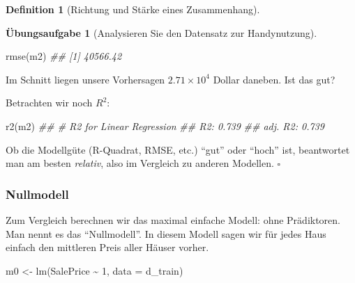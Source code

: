 \documentclass[
  a4paper,
  DIV=11]{scrreprt}
\newenvironment{Shaded}{\begin{snugshade}}{\end{snugshade}}
\newcommand{\AttributeTok}[1]{\textcolor[rgb]{0.40,0.45,0.13}{#1}}
\newcommand{\DecValTok}[1]{\textcolor[rgb]{0.68,0.00,0.00}{#1}}
\newcommand{\DocumentationTok}[1]{\textcolor[rgb]{0.37,0.37,0.37}{\textit{#1}}}
\newcommand{\FunctionTok}[1]{\textcolor[rgb]{0.28,0.35,0.67}{#1}}
\newcommand{\NormalTok}[1]{\textcolor[rgb]{0.00,0.23,0.31}{#1}}
\newcommand{\OtherTok}[1]{\textcolor[rgb]{0.00,0.23,0.31}{#1}}
\newcommand{\SpecialCharTok}[1]{\textcolor[rgb]{0.37,0.37,0.37}{#1}}
\theoremstyle{definition}
\newtheorem{exercise}{Übungsaufgabe}[chapter]
\theoremstyle{definition}
\theoremstyle{definition}
\newtheorem{definition}{Definition}[chapter]
\theoremstyle{remark}
\begin{document}
\begin{definition}[Richtung und Stärke eines
Zusammenhang]
\begin{exercise}[Analysieren Sie den Datensatz zur
Handynutzung]
\begin{Shaded}
\begin{Highlighting}[]
\FunctionTok{rmse}\NormalTok{(m2)}
\DocumentationTok{\#\# [1] 40566.42}
\end{Highlighting}
\end{Shaded}

Im Schnitt liegen unsere Vorhersagen \ensuremath{2.71\times 10^{4}}
Dollar daneben. Ist das gut?

Betrachten wir noch \(R^2\):

\begin{Shaded}
\begin{Highlighting}[]
\FunctionTok{r2}\NormalTok{(m2)}
\DocumentationTok{\#\# \# R2 for Linear Regression}
\DocumentationTok{\#\#        R2: 0.739}
\DocumentationTok{\#\#   adj. R2: 0.739}
\end{Highlighting}
\end{Shaded}

\begin{tcolorbox}[enhanced jigsaw, leftrule=.75mm, opacitybacktitle=0.6, colback=white, colframe=quarto-callout-note-color-frame, coltitle=black, colbacktitle=quarto-callout-note-color!10!white, opacityback=0, left=2mm, breakable, titlerule=0mm, toptitle=1mm, bottomtitle=1mm, rightrule=.15mm, title=\textcolor{quarto-callout-note-color}{\faInfo}\hspace{0.5em}{Hinweis}, arc=.35mm, bottomrule=.15mm, toprule=.15mm]

Ob die Modellgüte (R-Quadrat, RMSE, etc.) ``gut'' oder ``hoch'' ist,
beantwortet man am besten \emph{relativ}, also im Vergleich zu anderen
Modellen. \(\square\)

\end{tcolorbox}

\subsubsection{Nullmodell}\label{nullmodell}

Zum Vergleich berechnen wir das maximal einfache Modell: ohne
Prädiktoren. Man nennt es das ``Nullmodell''. In diesem Modell sagen wir
für jedes Haus einfach den mittleren Preis aller Häuser vorher.

\begin{Shaded}
\begin{Highlighting}[]
\NormalTok{m0 }\OtherTok{\textless{}{-}} \FunctionTok{lm}\NormalTok{(SalePrice }\SpecialCharTok{\textasciitilde{}} \DecValTok{1}\NormalTok{, }\AttributeTok{data =}\NormalTok{ d\_train)}
\end{Highlighting}
\end{Shaded}


\end{exercise}
\end{definition}
\end{document}
